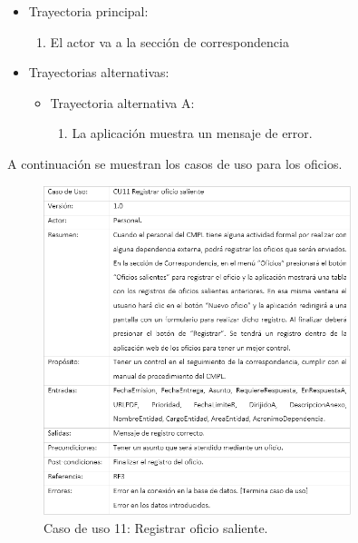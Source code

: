 			\begin{itemize}
				\item Trayectoria principal:
					\begin{enumerate}
						\item El actor va a la sección de correspondencia 
					\end{enumerate}
				\item Trayectorias alternativas:
					\begin{itemize}
						\item Trayectoria alternativa A:
							\begin{enumerate}
								\item La aplicación muestra un mensaje de error.
							\end{enumerate}
					\end{itemize}
			\end{itemize}

A continuación se muestran los casos de uso para los oficios.
\begin{figure}[htbp!]
		\centering
			\includegraphics[width=0.8\textwidth]{images/CU/CU11}
		\caption{Caso de uso 11: Registrar oficio saliente.}
		\label{Tabla}
	\end{figure}

